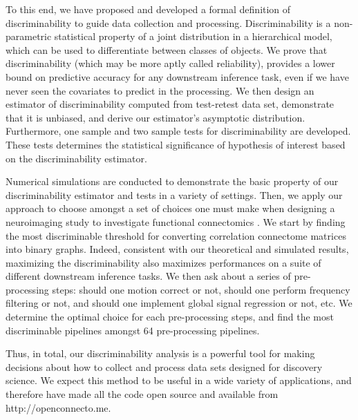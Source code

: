 \documentclass{article}
\begin{document}
To this end, we have proposed and developed a formal definition of discriminability to guide data collection and processing. Discriminability is a non-parametric statistical property of a joint distribution in a hierarchical model, which can be used to differentiate between classes of objects. We prove that discriminability (which may be more aptly called reliability), provides a lower bound on predictive accuracy for any downstream inference task, even if we have never seen the covariates to predict in the processing. We then design an estimator of discriminability computed from test-retest data set, demonstrate that it is unbiased, and derive our estimator’s asymptotic distribution. Furthermore, one sample and two sample tests for discriminability are developed. These tests determines the statistical significance of hypothesis of interest based on the discriminability estimator.

Numerical simulations are conducted to demonstrate the basic property of our discriminability estimator and tests in a variety of settings. Then, we apply our approach to choose amongst a set of choices one must make when designing a neuroimaging study to investigate functional connectomics \cite{fox2005human,biswal2010toward}. We start by finding the most discriminable threshold for converting correlation connectome matrices into binary graphs. Indeed, consistent with our theoretical and simulated results, maximizing the discriminability also maximizes performances on a suite of different downstream inference tasks. We then ask about a series of pre-processing steps: should one motion correct or not, should one perform frequency filtering or not, and should one implement global signal regression or not, etc. We determine the optimal choice for each pre-processing steps, and find the most discriminable pipelines amongst 64 pre-processing pipelines.

Thus, in total, our discriminability analysis is a powerful tool for making decisions about how to collect and process data sets designed for discovery science. We expect this method to be useful in a wide variety of applications,
and therefore have made all the code open source and available from http://openconnecto.me.
\end{document}
